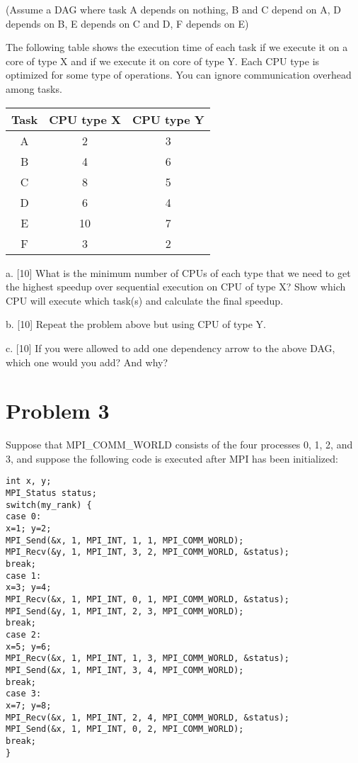 \documentclass{article}
\begin{document}
(Assume a DAG where task A depends on nothing, B and C depend on A, D depends on B, E depends on C and D, F depends on E)

The following table shows the execution time of each task if we execute it on a core of type X and if we execute it on core of type Y. Each CPU type is optimized for some type of operations.  You can ignore communication overhead among tasks.

\begin{tabular}{|c|c|c|}
\hline
Task & CPU type X & CPU type Y \\ \hline
A & 2 & 3 \\ \hline
B & 4 & 6 \\ \hline
C & 8 & 5 \\ \hline
D & 6 & 4 \\ \hline
E & 10 & 7 \\ \hline
F & 3 & 2 \\ \hline
\end{tabular}

a. [10] What is the minimum number of CPUs of each type that we need to get the highest speedup over sequential execution on CPU of type X? Show which CPU will execute which task(s) and calculate the final speedup.

b. [10] Repeat the problem above but using CPU of type Y.

c. [10]  If you were allowed to add one dependency arrow to the above DAG, which one would you add? And why?


\section*{Problem 3}
Suppose that MPI\_COMM\_WORLD consists of the four processes 0, 1, 2, and 3, and suppose the following code is executed after MPI has been initialized:

\begin{verbatim}
int x, y;
MPI_Status status;
switch(my_rank) {
case 0:
x=1; y=2;
MPI_Send(&x, 1, MPI_INT, 1, 1, MPI_COMM_WORLD);
MPI_Recv(&y, 1, MPI_INT, 3, 2, MPI_COMM_WORLD, &status);
break;
case 1:
x=3; y=4;
MPI_Recv(&x, 1, MPI_INT, 0, 1, MPI_COMM_WORLD, &status);
MPI_Send(&y, 1, MPI_INT, 2, 3, MPI_COMM_WORLD);
break;
case 2:
x=5; y=6;
MPI_Recv(&x, 1, MPI_INT, 1, 3, MPI_COMM_WORLD, &status);
MPI_Send(&x, 1, MPI_INT, 3, 4, MPI_COMM_WORLD);
break;
case 3:
x=7; y=8;
MPI_Recv(&x, 1, MPI_INT, 2, 4, MPI_COMM_WORLD, &status);
MPI_Send(&x, 1, MPI_INT, 0, 2, MPI_COMM_WORLD);
break;
}
\end{verbatim}
\end{document}
